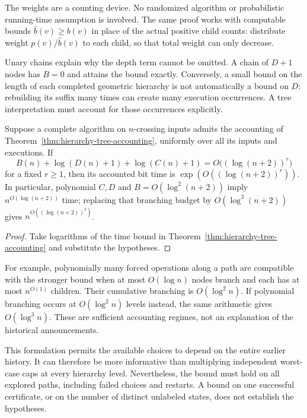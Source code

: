 The weights are a counting device.  No randomized algorithm or
probabilistic running-time assumption is involved.  The same proof works
with computable bounds $\widehat b(v)\geq b(v)$ in place of the actual
positive child counts: distribute weight $p(v)/\widehat b(v)$ to each
child, so that total weight can only decrease.

Unary chains explain why the depth term cannot be omitted.  A chain of
$D+1$ nodes has $B=0$ and attains the bound exactly.  Conversely, a
small bound on the length of each completed geometric hierarchy is not
automatically a bound on $D$: rebuilding its suffix many times can
create many execution occurrences.  A tree interpretation must account
for those occurrences explicitly.

\begin{corollary}
\label{cor:hierarchy-qp-budget}
Suppose a complete algorithm on $n$-crossing inputs admits the accounting
of Theorem~\ref{thm:hierarchy-tree-accounting}, uniformly over all its
inputs and executions.  If
\[
 B(n)+\log(D(n)+1)+\log(C(n)+1)
     =O\bigl((\log(n+2))^r\bigr)
\]
for a fixed $r\geq1$, then its accounted bit time is
$\exp(O((\log(n+2))^r))$.
In particular, polynomial $C,D$ and
$B=O(\log^2(n+2))$ imply $n^{O(\log(n+2))}$ time; replacing that
branching budget by $O(\log^3(n+2))$ gives
$n^{O((\log(n+2))^2)}$.
\end{corollary}

\begin{proof}
Take logarithms of the time bound in
Theorem~\ref{thm:hierarchy-tree-accounting} and substitute the hypotheses.
\end{proof}

For example, polynomially many forced operations along a path are
compatible with the stronger bound when at most $O(\log n)$ nodes
branch and each has at most $n^{O(1)}$ children.  Their cumulative
branching is $O(\log^2 n)$.  If polynomial branching occurs at
$O(\log^2 n)$ levels instead, the same arithmetic gives
$O(\log^3 n)$.  These are sufficient accounting regimes, not an
explanation of the historical announcements.

This formulation permits the available choices to depend on the entire
earlier history.  It can therefore be more informative than multiplying
independent worst-case caps at every hierarchy level.  Nevertheless,
the bound must hold on all explored paths, including failed choices and
restarts.  A bound on one successful certificate, or on the number of
distinct unlabeled states, does not establish the hypotheses.

